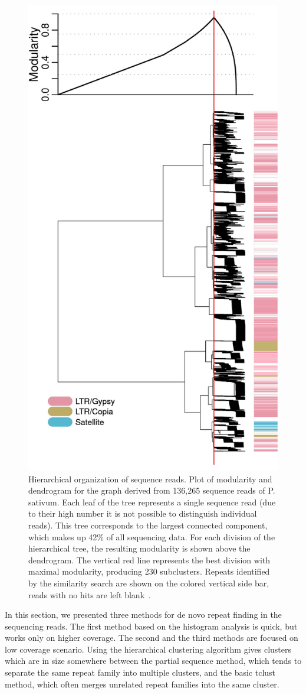 \begin{figure}[htbp]
  \centering
  \includegraphics[width=.5\textwidth]{../figures/repeat-clustering}
  \caption[Hierarchical organization of sequence reads]{Hierarchical organization of sequence reads. Plot of modularity and dendrogram for the graph derived from 136,265 sequence reads of P. sativum. Each leaf of the tree represents a single sequence read (due to their high number it is not possible to distinguish individual reads). This tree corresponds to the largest connected component, which makes up 42\% of all sequencing data. For each division of the hierarchical tree, the resulting modularity is shown above the dendrogram. The vertical red line represents the best division with maximal modularity, producing 230 subclusters. Repeats identified by the similarity search are shown on the colored vertical side bar, reads with no hits are left blank~\cite{novak2010graph}.}\label{fig:repeat-clustering}
\end{figure}

In this section, we presented three methods for de novo repeat finding in the sequencing reads. The first method based on the histogram analysis is quick, but works only on higher coverage. The second and the third methods are focused on low coverage scenario. Using the hierarchical clustering algorithm gives clusters which are in size somewhere between the partial sequence method, which tends to separate the same repeat family into multiple clusters, and the basic tclust method, which often merges unrelated repeat families into the same cluster.

